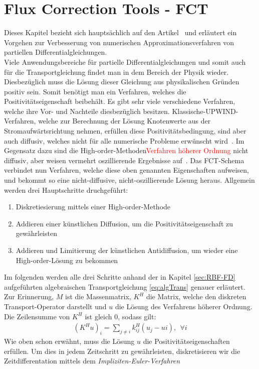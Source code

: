 \documentclass[a4paper,11pt]{article}
\newcommand{\col}[2][red]{\textcolor{#1}{#2}}
\begin{document}
\section{Flux Correction Tools - FCT}
Dieses Kapitel bezieht sich hauptsächlich auf den Artikel~\cite{kuzmin2002flux} und erläutert ein Vorgehen zur Verbesserung von numerischen Approximationsverfahren von partiellen Differentialgleichungen.\\
Viele Anwendungsbereiche für partielle Differentialgleichungen und somit auch für die Transportgleichung findet man in dem Bereich der Physik wieder. Diesbezüglich muss die Lösung dieser Gleichung aus physikalischen Gründen positiv sein. Somit benötigt man ein Verfahren, welches die Positivitätseigenschaft beibehält. Es gibt sehr viele verschiedene Verfahren, welche ihre Vor- und Nachteile diesbezüglich besitzen. Klassische-UPWIND-Verfahren, welche zur Berechnung der Lösung Knotenwerte aus der Stromaufwärtsrichtung nehmen, erfüllen diese Positivitätsbedingung, sind aber auch diffusiv, welches nicht für alle numerische Probleme erwünscht wird~\cite{kuzmin2002flux}. Im Gegensatz dazu sind die High-order-Methoden\col{Verfahren höherer Ordnung} nicht diffusiv, aber weisen vermehrt oszillierende Ergebnisse auf~\cite{kuzmin2002flux}. Das FCT-Schema verbindet nun Verfahren, welche diese oben genannten Eigenschaften aufweisen, und bekommt so eine nicht-diffusive, nicht-oszillierende Lösung heraus. Allgemein werden drei Hauptschritte druchgeführt:
\begin{enumerate}
 \item Diskretiesierung mittels einer High-order-Methode
 \item Addieren einer künstlichen Diffusion, um die Positivitätseigenschaft zu gewährleisten
 \item  Addieren und Limitierung der künstlichen Antidiffusion, um wieder eine High-order-Lösung zu bekommen
\end{enumerate}
Im folgenden werden alle drei Schritte anhand der in Kapitel \ref{sec:RBF-FD} aufgeführten algebraischen Transportgleichung \eqref{eq:algTrans} genauer erläutert. Zur Erinnerung, $M$ ist die Massenmatrix, $K^H$ die Matrix, welche den diskreten Transport-Operator darstellt und $u$ die Lösung des Verfahrens höherer Ordnung. Die Zeilensumme von $K^H$ ist gleich 0, sodass gilt:
\begin{align}
 (K^Hu)_i=\sum_{j\neq i}k_{ij}^H(u_j-ui),~~\forall i
\end{align}
  Wie oben schon erwähnt, muss die Lösung $u$ die Positivitätseigenschaften erfüllen. Um dies in jedem Zeitschritt zu gewährleisten, diskretisieren wir die Zeitdifferentation mittels dem \textit{Impliziten-Euler-Verfahren}
\end{document}
